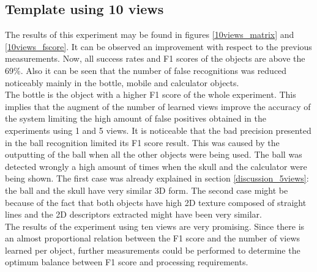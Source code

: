 \newpage

	\subsection{Template using 10 views}
	The results of this experiment may be found in figures \ref{10views_matrix} and \ref{10views_fscore}. 
	It can be observed an improvement with respect to the previous measurements. 
	Now, all success rates and F1 scores of the objects are above the 69\%. 
	Also it can be seen that the number of false recognitions was reduced noticeably mainly in the bottle, mobile and calculator objects. 
	\\

	The bottle is the object with a higher F1 score of the whole experiment. 
	This implies that the augment of the number of learned views improve the accuracy of the system limiting the high amount of false positives obtained in the experiments using 1 and 5 views. 
	It is noticeable that the bad precision presented in the ball recognition limited its F1 score result. 
	This was caused by the outputting of the ball when all the other objects were being used. 
	The ball was detected wrongly a high amount of times when the skull and the calculator were being shown.
	The first case was already explained in section \ref{discussion_5views}: the ball and the skull have very similar 3D form. 
	The second case might be because of the fact that both objects have high 2D texture composed of straight lines and the 2D descriptors extracted might have been very similar. 
	\\

	The results of the experiment using ten views are very promising. 
	Since there is an almost proportional relation between the F1 score and the number of views learned per object, further measurements could be performed to determine the optimum balance between F1 score and processing requirements. 
	
	


